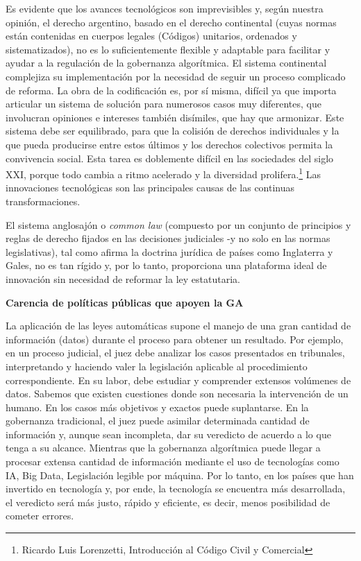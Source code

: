 \documentclass[12pt]{report} %
\begin{document}
\begin{itemize}
Es evidente que los avances tecnológicos son imprevisibles y, según nuestra opinión, el derecho argentino, basado en el derecho continental (cuyas normas están contenidas en cuerpos legales (Códigos) unitarios, ordenados y sistematizados), no es lo suficientemente flexible y adaptable para facilitar y ayudar a la regulación de la gobernanza algorítmica. El sistema continental complejiza su implementación por la necesidad de seguir un proceso complicado de reforma. La obra de la codificación es, por sí misma, difícil ya que importa articular un sistema de solución para numerosos casos muy diferentes, que involucran opiniones e intereses también disímiles, que hay que armonizar. Este sistema debe ser equilibrado, para que la colisión de derechos individuales y la que pueda producirse entre estos últimos y los derechos colectivos permita la convivencia social.  Esta tarea es doblemente difícil en las sociedades del siglo XXI, porque todo cambia a ritmo acelerado y la diversidad prolifera.\footnote{Ricardo Luis Lorenzetti, Introducción al Código Civil y Comercial }  Las innovaciones tecnológicas son las principales causas de las continuas transformaciones.

El sistema anglosajón o \textit{common law} (compuesto por un conjunto de principios y reglas de derecho fijados en las decisiones judiciales -y no solo en las normas legislativas), tal como afirma la doctrina jurídica de países como Inglaterra y Gales, no es tan rígido y, por lo tanto, proporciona una plataforma ideal de innovación sin necesidad de reformar la ley estatutaria.

\textbf{Carencia de políticas públicas que apoyen la GA}

La aplicación de las leyes automáticas supone el manejo de una gran cantidad de información (datos) durante el proceso para obtener un resultado. Por ejemplo, en un proceso judicial, el juez debe analizar los casos presentados en tribunales, interpretando y haciendo valer la legislación aplicable al procedimiento correspondiente. En su labor, debe estudiar y comprender extensos volúmenes de datos. Sabemos que existen cuestiones donde son necesaria la intervención de un humano. En los casos más objetivos y exactos puede suplantarse. En la gobernanza tradicional, el juez puede asimilar determinada cantidad de información y, aunque sean incompleta, dar su veredicto de acuerdo a lo que tenga a su alcance. Mientras que la gobernanza algorítmica puede llegar a procesar extensa cantidad de información mediante el uso de tecnologías como IA, Big Data, Legislación legible por máquina. Por lo tanto, en los países que han invertido en tecnología y, por ende, la tecnología se encuentra más desarrollada, el veredicto será más justo, rápido y eficiente, es decir, menos posibilidad de cometer errores. 


\end{itemize}
\end{document}
